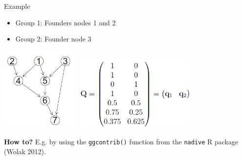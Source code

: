 \documentclass[10pt,ignorenonframetext,]{beamer}
\providecommand{\tightlist}{%
  \setlength{\itemsep}{0pt}\setlength{\parskip}{0pt}}
\begin{document}
\begin{frame}[fragile]

\begin{block}{Example}

\vspace{3mm}

\begin{itemize}
\tightlist
\item
  Group 1: Founders nodes 1 and 2
\item
  Group 2: Founder node 3
\end{itemize}

\vspace{3mm}

\center

\includegraphics[width=0.3\textwidth,height=\textheight]{graphics/pedigree_GSE.png}
\hspace{6mm}
\includegraphics[width=0.45\textwidth,height=\textheight]{graphics/Q_GSE.png}

\vspace{10mm}

\flushleft

\small

\textbf{How to?} E.g. by using the \texttt{ggcontrib()} function from
the \texttt{nadive} R package (Wolak 2012).

\end{block}

\end{frame}
\end{document}

